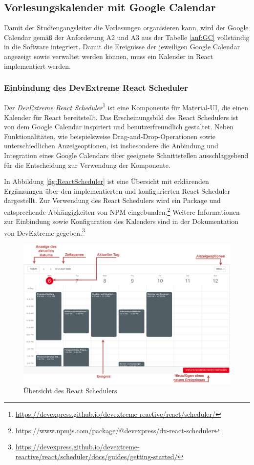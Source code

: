 \subsection{Vorlesungskalender mit Google Calendar}\label{ch:GC}
Damit der Studiengangsleiter die Vorlesungen organisieren kann, wird der Google Calendar gemäß der Anforderung A2 und A3 aus der Tabelle \vref{anf:GC} vollständig in die Software integriert.
Damit die Ereignisse der jeweiligen Google Calendar angezeigt sowie verwaltet werden können, muss ein Kalender in React implementiert werden. 

\subsubsection{Einbindung des DevExtreme React Scheduler}
Der \textit{DevExtreme React Scheduler}\footnote{\url{https://devexpress.github.io/devextreme-reactive/react/scheduler/}} ist eine Komponente für Material-UI, die einen Kalender für React bereitstellt. 
Das Erscheinungsbild des React Schedulers ist von dem Google Calendar inspiriert und benutzerfreundlich gestaltet.\autocite[Vgl.][]{ReactScheduler} 
Neben Funktionalitäten, wie beispielsweise Drag-and-Drop-Operationen sowie unterschiedlichen Anzeigeoptionen, ist insbesondere die Anbindung und Integration eines Google Calendars über geeignete Schnittstellen ausschlaggebend für die Entscheidung zur Verwendung der Komponente. 

In Abbildung \vref{fig:ReactScheduler} ist eine Übersicht mit erklärenden Ergänzungen über den implementierten und konfigurierten React Scheduler dargestellt. 
Zur Verwendung des React Schedulers wird ein Package und entsprechende Abhängigkeiten von NPM eingebunden.\footnote{\url{https://www.npmjs.com/package/@devexpress/dx-react-scheduler}}
Weitere Informationen zur Einbindung sowie Konfiguration des Kalenders sind in der Dokumentation von DevExtreme gegeben.\footnote{\url{https://devexpress.github.io/devextreme-reactive/react/scheduler/docs/guides/getting-started/}}
\begin{figure}[H]
	\centering 
	\includegraphics[width=\textwidth]{img/FrontEnd/ReactCalendar.pdf}
	\caption[Übersicht des React Schedulers]{\label{fig:ReactScheduler}Übersicht des React Schedulers}
\end{figure}

